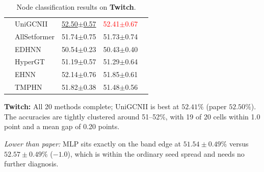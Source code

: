 \documentclass[11pt,a4paper]{article}
\begin{document}
\begin{table}[H]
\begin{tabular}{llccc}
		 & UniGCNII          & \underline{52.50$\pm$0.57}   & \textcolor{red}{52.41$\pm$0.67}   &  \\
		 & AllSetformer      & 51.74$\pm$0.75   & 51.73$\pm$0.74   &  \\
		 & EDHNN             & 50.54$\pm$0.23   & 50.43$\pm$0.40   &  \\
		 & HyperGT           & 51.19$\pm$0.57   & 51.29$\pm$0.64   &  \\
		 & EHNN              & 52.14$\pm$0.76   & 51.85$\pm$0.61   &  \\
		 & TMPHN             & 51.82$\pm$0.38   & 51.48$\pm$0.56   &  \\
		\bottomrule
	\end{tabular}
	\caption{Node classification results on \textbf{Twitch}.}
\end{table}

\par\smallskip
\noindent\textbf{Twitch:} All 20 methods complete; UniGCNII is best at $52.41\%$ (paper $52.50\%$). The accuracies are tightly clustered around 51--52\%, with 19 of 20 cells within 1.0 point and a mean gap of 0.20 points.

\noindent\textit{Lower than paper:} MLP sits exactly on the band edge at $51.54\pm0.49\%$ versus $52.57\pm0.49\%$ ($-1.0$), which is within the ordinary seed spread and needs no further diagnosis.
\end{document}
